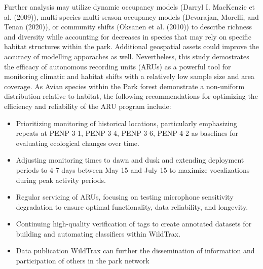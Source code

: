 \documentclass[
  letterpaper,
  DIV=11,
  numbers=noendperiod]{scrartcl}
\providecommand{\tightlist}{%
  \setlength{\itemsep}{0pt}\setlength{\parskip}{0pt}}
\begin{document}
Further analysis may utilize dynamic occupancy models (Darryl I.
MacKenzie et al. (2009)), multi-species multi-season occupancy models
(Devarajan, Morelli, and Tenan (2020)), or community shifts (Oksanen et
al. (2010)) to describe richness and diversity while accounting for
decreases in species that may rely on specific habitat structures within
the park. Additional geospatial assets could improve the accuracy of
modelling apporaches as well. Nevertheless, this study demostrates the
efficacy of autonomous recording units (ARUs) as a powerful tool for
monitoring climatic and habitat shifts with a relatively low sample size
and area coverage. As Avian species within the Park forest demonstrate a
non-uniform distribution relative to habitat, the following
recommendations for optimizing the efficiency and reliability of the ARU
program include:

\begin{itemize}
\tightlist
\item
  Prioritizing monitoring of historical locations, particularly
  emphasizing repeats at PENP-3-1, PENP-3-4, PENP-3-6, PENP-4-2 as
  baselines for evaluating ecological changes over time.
\item
  Adjusting monitoring times to dawn and dusk and extending deployment
  periods to 4-7 days between May 15 and July 15 to maximize
  vocalizations during peak activity periods.
\item
  Regular servicing of ARUs, focusing on testing microphone sensitivity
  degradation to ensure optimal functionality, data reliability, and
  longevity.
\item
  Continuing high-quality verification of tags to create annotated
  datasets for building and automating classifiers within WildTrax.
\item
  Data publication WildTrax can further the dissemination of information
  and participation of others in the park network
\end{itemize}
\end{document}
